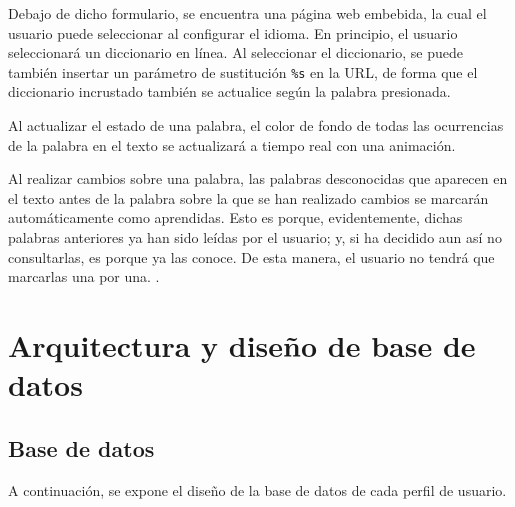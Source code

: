 Debajo de dicho formulario, se encuentra una página web embebida, la cual el usuario puede seleccionar al configurar el idioma. En principio, el usuario seleccionará un diccionario en línea. Al seleccionar el diccionario, se puede también insertar un parámetro de sustitución \texttt{\%s} en la URL, de forma que el diccionario incrustado también se actualice según la palabra presionada.

Al actualizar el estado de una palabra, el color de fondo de todas las ocurrencias de la palabra en el texto se actualizará a tiempo real con una animación.

Al realizar cambios sobre una palabra, las palabras desconocidas que aparecen en el texto antes de la palabra sobre la que se han realizado cambios se marcarán automáticamente como aprendidas. Esto es porque, evidentemente, dichas palabras anteriores ya han sido leídas por el usuario; y, si ha decidido aun así no consultarlas, es porque ya las conoce. De esta manera, el usuario no tendrá que marcarlas una por una. .


\section{Arquitectura y diseño de base de datos}

\subsection{Base de datos}

A continuación, se expone el diseño de la base de datos de cada perfil de usuario.

